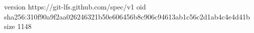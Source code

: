 version https://git-lfs.github.com/spec/v1
oid sha256:310f90a9f2aa026246321b50e606456b8c906c94613ab1c56c2d1ab4c4e4d41b
size 1148
